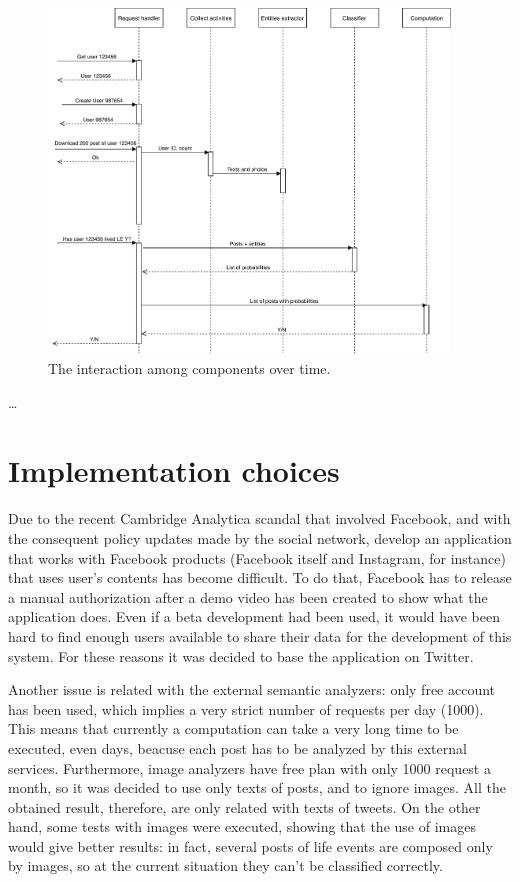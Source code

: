 \begin{figure}
\centering
\includegraphics[width=%
0.95\textwidth]{img/Interaction}
\caption{The interaction among components over time.}
\label{fig:interaction}
\end{figure}

\dots

\section{Implementation choices}
Due to the recent Cambridge Analytica scandal that involved Facebook, and with the consequent policy updates made by the social network, develop an application that works with Facebook products (Facebook itself and Instagram, for instance) that uses user's contents has become difficult. To do that, Facebook has to release a manual authorization after a demo video has been created to show what the application does. Even if a beta development had been used, it would have been hard to find enough users available to share their data for the development of this system. For these reasons it was decided to base the application on Twitter.

Another issue is related with the external semantic analyzers: only free account has been used, which implies a very strict number of requests per day (1000). This means that currently a computation can take a very long time to be executed, even days, beacuse each post has to be analyzed by this external services. Furthermore, image analyzers have free plan with only 1000 request a month, so it was decided to use only texts of posts, and to ignore images. All the obtained result, therefore, are only related with texts of tweets. On the other hand, some tests with images were executed, showing that the use of images would give better results: in fact, several posts of life events are composed only by images, so at the current situation they can't be classified correctly.

